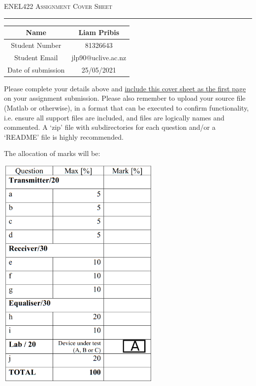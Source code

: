 \begin{center}
    {\huge\textsc{ENEL422 Assignment Cover Sheet}}
    \rule{\textwidth}{1pt}
    \vspace{5ex}

    \begin{tabular}{|c|c|}
        \hline
        Name               & Liam Pribis        \\
        \hline
        Student Number     & 81326643           \\
        \hline
        Student Email      & jlp90@uclive.ac.nz \\
        \hline
        Date of submission & 25/05/2021         \\
        \hline
    \end{tabular}
\end{center}
Please complete your details above and \ul{include this cover sheet as the first
    page} on your assignment submission. Please also remember to upload your source
file (Matlab or otherwise), in a format that can be executed  to confirm
functionality, i.e.  ensure all  support files  are included,  and files are
logically names and commented.  A ‘zip’ file with subdirectories for each
question and/or a ‘README’ file is highly recommended.

The allocation of marks will be:

\begin{center}
    \includegraphics[width=0.6\textwidth, keepaspectratio]{marks_table.png}
\end{center}